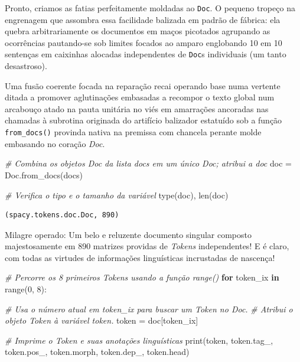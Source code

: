 \documentclass[
  brazilian,
]{article}
\newenvironment{Shaded}{}{}
\newcommand{\BuiltInTok}[1]{#1}
\newcommand{\CommentTok}[1]{\textcolor[rgb]{0.38,0.63,0.69}{\textit{#1}}}
\newcommand{\ControlFlowTok}[1]{\textcolor[rgb]{0.00,0.44,0.13}{\textbf{#1}}}
\newcommand{\DecValTok}[1]{\textcolor[rgb]{0.25,0.63,0.44}{#1}}
\newcommand{\KeywordTok}[1]{\textcolor[rgb]{0.00,0.44,0.13}{\textbf{#1}}}
\newcommand{\NormalTok}[1]{#1}
\newcommand{\OperatorTok}[1]{\textcolor[rgb]{0.40,0.40,0.40}{#1}}
\begin{document}
Pronto, criamos as fatias perfeitamente moldadas ao \texttt{Doc}. O
pequeno tropeço na engrenagem que assombra essa facilidade balizada em
padrão de fábrica: ela quebra arbitrariamente os documentos em maços
picotados agrupando as ocorrências pautando-se sob limites focados ao
amparo englobando 10 em 10 sentenças em caixinhas alocadas independentes
de \texttt{Doc}s individuais (um tanto desastroso).

Uma fusão coerente focada na reparação recai operando base numa vertente
ditada a promover aglutinações embasadas a recompor o texto global num
arcabouço atado na pauta unitária no viés em amarrações ancoradas nas
chamadas à subrotina originada do artifício balizador estatuído sob a
função \texttt{from\_docs()} provinda nativa na premissa com chancela
perante molde embasando no coração \emph{Doc}.

\begin{Shaded}
\begin{Highlighting}[]
\CommentTok{\# Combina os objetos Doc da lista \textquotesingle{}docs\textquotesingle{} em um único Doc; atribui a \textquotesingle{}doc\textquotesingle{}}
\NormalTok{doc }\OperatorTok{=}\NormalTok{ Doc.from\_docs(docs)}

\CommentTok{\# Verifica o tipo e o tamanho da variável}
\BuiltInTok{type}\NormalTok{(doc), }\BuiltInTok{len}\NormalTok{(doc)}
\end{Highlighting}
\end{Shaded}

\begin{verbatim}
(spacy.tokens.doc.Doc, 890)
\end{verbatim}

Milagre operado: Um belo e reluzente documento singular composto
majestosamente em 890 matrizes providas de \emph{Tokens} independentes!
E é claro, com todas as virtudes de informações linguísticas incrustadas
de nascença!

\begin{Shaded}
\begin{Highlighting}[]
\CommentTok{\# Percorre os 8 primeiros Tokens usando a função range()}
\ControlFlowTok{for}\NormalTok{ token\_ix }\KeywordTok{in} \BuiltInTok{range}\NormalTok{(}\DecValTok{0}\NormalTok{, }\DecValTok{8}\NormalTok{):}
    
    \CommentTok{\# Usa o número atual em \textquotesingle{}token\_ix\textquotesingle{} para buscar um Token no Doc.}
    \CommentTok{\# Atribui o objeto Token à variável \textquotesingle{}token\textquotesingle{}.}
\NormalTok{    token }\OperatorTok{=}\NormalTok{ doc[token\_ix]}
    
    \CommentTok{\# Imprime o Token e suas anotações linguísticas}
    \BuiltInTok{print}\NormalTok{(token, token.tag\_, token.pos\_, token.morph, token.dep\_, token.head)}
\end{Highlighting}
\end{Shaded}
\end{document}
